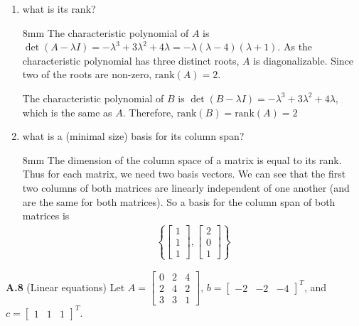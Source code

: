 \documentclass{article}
\newenvironment{solution}{\begin{adjustwidth}{8mm}{}}{\end{adjustwidth}}
\begin{document}
\begin{enumerate}
        \item what is its rank?
        \begin{solution}
                The characteristic polynomial of $A$ is 
                $\det(A - \lambda I) = -\lambda^3 + 3\lambda^2 + 4\lambda = -\lambda(\lambda - 4) (\lambda + 1)$.
                As the characteristic polynomial has three distinct roots, $A$ is diagonalizable.
                Since two of the roots are non-zero, $\text{rank} (A) = 2$.

                The characteristic polynomial of $B$ is
                $\det(B - \lambda I) = -\lambda^3 + 3\lambda^2 + 4\lambda$, which is the same as $A$.
                Therefore, $\text{rank} (B) = \text{rank} (A) = 2$
        \end{solution}
        \item what is a (minimal size) basis for its column span?
        \begin{solution}
                The dimension of the column space of a matrix is equal to its rank.
                Thus for each matrix, we need two basis vectors.
                We can see that the first two columns of both matrices are linearly independent of one another (and are the same for both matrices).
                So a basis for the column span of both matrices is 
                \begin{align*}
                        \left\{
                        \begin{bmatrix} 1 \\ 1 \\ 1 \end{bmatrix},
                        \begin{bmatrix} 2 \\ 0 \\ 1 \end{bmatrix}
                        \right\}
                \end{align*}
        \end{solution}
\end{enumerate}


\textbf{A.8}
(Linear equations)
Let $A = \begin{bmatrix} 
                0 & 2 & 4 \\ 
                2 & 4 & 2 \\ 
                3 & 3 & 1 
        \end{bmatrix}$, 
        $b = \begin{bmatrix} 
                -2 & -2 & -4 
        \end{bmatrix}^T$, 
        and $c=\begin{bmatrix} 
                1 & 1 & 1 
        \end{bmatrix}^T$.
\end{document}
